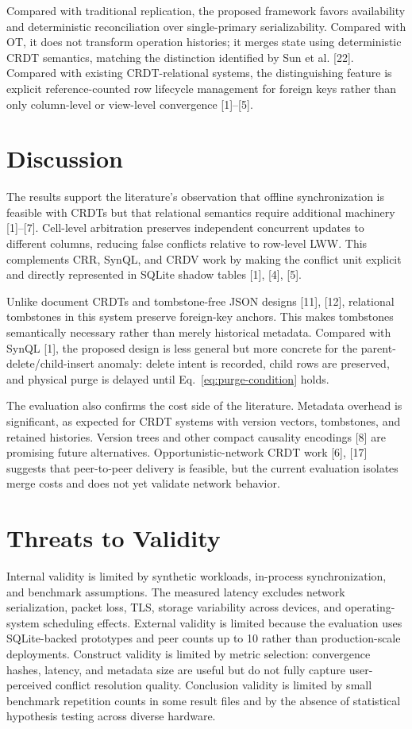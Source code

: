 \documentclass[pdflatex,sn-mathphys-num]{sn-jnl}
\begin{document}
Compared with traditional replication, the proposed framework favors availability and deterministic reconciliation over single-primary serializability. Compared with OT, it does not transform operation histories; it merges state using deterministic CRDT semantics, matching the distinction identified by Sun et al. [22]. Compared with existing CRDT-relational systems, the distinguishing feature is explicit reference-counted row lifecycle management for foreign keys rather than only column-level or view-level convergence [1]--[5].

\section{Discussion}

The results support the literature's observation that offline synchronization is feasible with CRDTs but that relational semantics require additional machinery [1]--[7]. Cell-level arbitration preserves independent concurrent updates to different columns, reducing false conflicts relative to row-level LWW. This complements CRR, SynQL, and CRDV work by making the conflict unit explicit and directly represented in SQLite shadow tables [1], [4], [5].

Unlike document CRDTs and tombstone-free JSON designs [11], [12], relational tombstones in this system preserve foreign-key anchors. This makes tombstones semantically necessary rather than merely historical metadata. Compared with SynQL [1], the proposed design is less general but more concrete for the parent-delete/child-insert anomaly: delete intent is recorded, child rows are preserved, and physical purge is delayed until Eq.~\eqref{eq:purge-condition} holds.

The evaluation also confirms the cost side of the literature. Metadata overhead is significant, as expected for CRDT systems with version vectors, tombstones, and retained histories. Version trees and other compact causality encodings [8] are promising future alternatives. Opportunistic-network CRDT work [6], [17] suggests that peer-to-peer delivery is feasible, but the current evaluation isolates merge costs and does not yet validate network behavior.

\section{Threats to Validity}

Internal validity is limited by synthetic workloads, in-process synchronization, and benchmark assumptions. The measured latency excludes network serialization, packet loss, TLS, storage variability across devices, and operating-system scheduling effects. External validity is limited because the evaluation uses SQLite-backed prototypes and peer counts up to 10 rather than production-scale deployments. Construct validity is limited by metric selection: convergence hashes, latency, and metadata size are useful but do not fully capture user-perceived conflict resolution quality. Conclusion validity is limited by small benchmark repetition counts in some result files and by the absence of statistical hypothesis testing across diverse hardware.
\end{document}

